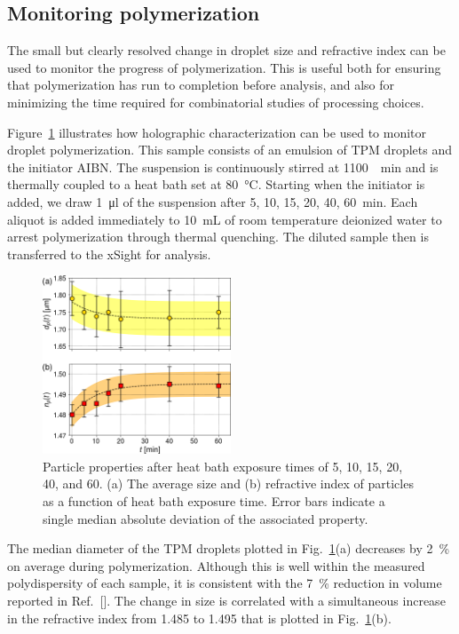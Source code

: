 \documentclass[journal=langd5,manuscript=article]{achemso}
\begin{document}
\subsection{Monitoring polymerization}
\label{sec:monitoring}

The small but clearly resolved 
change in droplet size and refractive index can be
used to monitor the progress of polymerization.
This is useful both for ensuring that polymerization has run
to completion before analysis, and also for minimizing the
time required for combinatorial studies of processing choices.

Figure~\ref{fig:heat_size_time} illustrates how
holographic characterization can be used to monitor
droplet polymerization.  This sample
consists of an emulsion of TPM droplets and 
the initiator AIBN.
The suspension is continuously stirred at 
\SI{1100}{\per\minute}
and is thermally coupled to a heat bath set at \SI{80}{\degreeCelsius}.
Starting when the initiator is added,
we draw \SI{1}{\ul} of the suspension after 
\num{5}, \num{10}, \num{15},
\num{20}, \num{40}, \SI{60}{\minute}.
Each aliquot is added immediately 
to \SI{10}{\milli\liter} of room temperature deionized water
to arrest polymerization through thermal quenching.
The diluted sample then is transferred to the xSight
for analysis.

\begin{figure}
  \centering
  \includegraphics[width=0.5\textwidth]{polymerization04}
  \caption{Particle properties after heat bath exposure times
    of \num{5}, \num{10}, \num{15}, \num{20}, \num{40}, and 
    \SI{60}{\min}.
    (a) The average size and (b) refractive index of particles as a function
    of heat bath exposure time.
    Error bars indicate a single median absolute deviation
    of the associated property.}
  \label{fig:heat_size_time}
\end{figure}

The median diameter of the TPM droplets plotted
in Fig.~\ref{fig:heat_size_time}(a)
decreases by \SI{2}{\percent} on average
during polymerization.
Although this is well within the
measured polydispersity of each sample, 
it is consistent with the \SI{7}{\percent} reduction
in volume reported in Ref.~[{\hspace*{-1ex}}].
The change in size is correlated with 
a simultaneous increase in the refractive index
from \num{1.485} to \num{1.495} that is
plotted in Fig.~\ref{fig:heat_size_time}(b).
\end{document}
